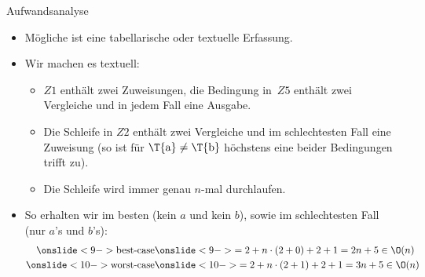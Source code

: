 {\begin{frame}{Aufwandsanalyse}
\begin{itemize}
    \itemsep14pt
    \item<3-> Mögliche ist eine tabellarische oder textuelle Erfassung.
    \item<4-> Wir machen es textuell: \begin{itemize}
        \itemsep7pt
        \item<5-> \(Z1\) enthält zwei Zuweisungen, die Bedingung in~\(Z5\) enthält zwei\\Vergleiche und in jedem Fall eine Ausgabe. %
        \item<6-> Die Schleife in \(Z2\) enthält zwei Vergleiche und im schlechtesten Fall eine Zuweisung (so ist für \(\text{\T{a}} \neq \text{\T{b}}\) höchstens eine beider Bedingungen trifft zu).
        \item<7-> Die Schleife wird immer genau \(n\)-mal durchlaufen.
    \end{itemize}
    \item<8-> So erhalten wir im besten (kein \(a\) und kein \(b\)), sowie im schlechtesten Fall (nur \(a\)'s und \(b\)'s):\vspace*{-.5\topsep} \begin{align*}
        \onslide<9->{\text{best-case}} &\onslide<9->{= 2 + n \cdot (2 + 0) + 2 + 1 = 2n + 5 \in \O(n)}\\
        \onslide<10->{\text{worst-case}} &\onslide<10->{= 2 + n \cdot (2 + 1) + 2 + 1 = 3n + 5 \in \O(n)}
    \end{align*}
\end{itemize}
\endtikzpicture
\end{frame}
}

